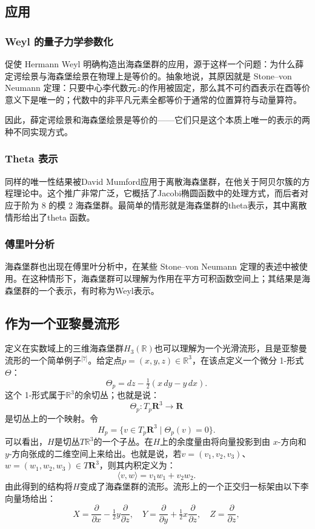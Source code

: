 \subsection{应用}
\subsubsection{Weyl 的量子力学参数化}
促使 Hermann Weyl 明确构造出海森堡群的应用，源于这样一个问题：为什么薛定谔绘景与海森堡绘景在物理上是等价的。抽象地说，其原因就是 Stone–von Neumann 定理：只要中心李代数元$z$的作用被固定，那么其不可约酉表示在酉等价意义下是唯一的；代数中的非平凡元素全都等价于通常的位置算符与动量算符。

因此，薛定谔绘景和海森堡绘景是等价的——它们只是这个本质上唯一的表示的两种不同实现方式。
\subsubsection{Theta 表示}
同样的唯一性结果被David Mumford应用于离散海森堡群，在他关于阿贝尔簇的方程理论中。这个推广非常广泛，它概括了Jacobi椭圆函数中的处理方式，而后者对应于阶为 8 的模 2 海森堡群。最简单的情形就是海森堡群的theta表示，其中离散情形给出了theta 函数。
\subsubsection{傅里叶分析}
海森堡群也出现在傅里叶分析中，在某些 Stone–von Neumann 定理的表述中被使用。在这种情形下，海森堡群可以理解为作用在平方可积函数空间上；其结果是海森堡群的一个表示，有时称为Weyl表示。
\subsection{作为一个亚黎曼流形}
定义在实数域上的三维海森堡群$H_{3}(\mathbb{R})$也可以理解为一个光滑流形，且是亚黎曼流形的一个简单例子\(^\text{[7]}\)。给定点$p = (x, y, z) \in \mathbb{R}^{3}$，在该点定义一个微分 1-形式 $\Theta$：
$$
\Theta_{p} = dz - \tfrac{1}{2}(x \, dy - y \, dx).~
$$
这个 1-形式属于$\mathbb{R}^{3}$的余切丛；也就是说：
$$
\Theta_{p} : T_{p}\mathbf{R}^{3} \to \mathbf{R}~
$$
是切丛上的一个映射。令
$$
H_{p} = \{ v \in T_{p}\mathbf{R}^{3} \mid \Theta_{p}(v) = 0 \}.~
$$
可以看出，$H$是切丛$T\mathbb{R}^{3}$的一个子丛。在$H$上的余度量由将向量投影到由 $x$-方向和 $y$-方向张成的二维空间上来给出。也就是说，若$v = (v_{1}, v_{2}, v_{3})$、$w = (w_{1}, w_{2}, w_{3}) \in T\mathbf{R}^{3}$，则其内积定义为：
$$
\langle v, w \rangle = v_{1} w_{1} + v_{2} w_{2}.~
$$
由此得到的结构将$H$变成了海森堡群的流形。流形上的一个正交归一标架由以下李向量场给出：
$$
X = \frac{\partial}{\partial x} - \tfrac{1}{2}y \frac{\partial}{\partial z}, \quad
Y = \frac{\partial}{\partial y} + \tfrac{1}{2}x \frac{\partial}{\partial z}, \quad
Z = \frac{\partial}{\partial z},~
$$

